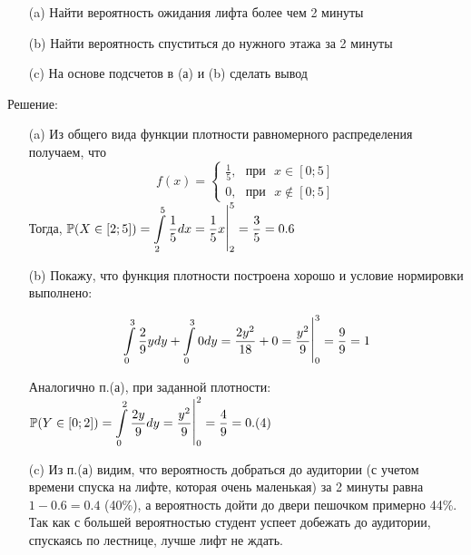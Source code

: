 \documentclass[a4paper,11pt]{article}
\begin{document}
	\begin{enumerate}
		\item [(a)] Найти вероятность ожидания лифта более чем 2 минуты
		\item [(b)] Найти вероятность спуститься до нужного этажа за 2 минуты
		\item [(c)] На основе подсчетов в (а) и (b) сделать вывод
	\end{enumerate}

	\begin{center}
		{\large Решение:}
	\end{center}

	\begin{enumerate}
		\item [(a)] 
		Из общего вида функции плотности равномерного распределения получаем, что
		\[
		f(x) = 	\begin{cases}
		\frac{1}{5}, \text{ } \text{при} \text{ } x\in[0;5] \\ 
		0, \text{ } \text{при} \text{ } x\notin[0;5]
		\end{cases} 
		\]
		Тогда, $ \mathbb{P}(X\in[2;5]) =  \Large \displaystyle \int\limits_{2}^{5}\dfrac{1}{5}dx = \dfrac{1}{5}x\bigg|^{5}_{2}=\dfrac{3}{5}=0.6$
		
		\item [(b)] Покажу, что функция плотности построена хорошо и условие нормировки выполнено: 
		
		\[ 
		\Large \displaystyle \int\limits_{0}^{3}\dfrac{2}{9}ydy+\Large \displaystyle \int\limits_{0}^{3}0dy = \dfrac{2y^2}{18}+0=\dfrac{y^2}{9}\bigg|_{0}^{3}=\dfrac{9}{9}=1
		\]
		
		Аналогично п.(а), при заданной плотности: $ \mathbb{P}(Y\in[0;2]) = \Large \displaystyle \int\limits_{0}^{2}\dfrac{2y}{9}dy = \dfrac{y^2}{9}\bigg|_{0}^{2}=\dfrac{4}{9}=0.(4)$
		
		\item [(c)] Из п.(а) видим, что вероятность добраться до аудитории (с учетом времени спуска на лифте, которая очень маленькая) за 2 минуты равна $ 1 - 0.6 = 0.4 $ (40\%), а вероятность дойти до двери пешочком примерно 44\%. Так как с большей вероятностью студент успеет добежать до аудитории, спускаясь по лестнице, лучше лифт не ждать. 
	\end{enumerate}
\end{document}
